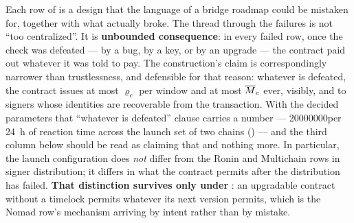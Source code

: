Each row of  is a design that the language of a bridge roadmap could be
mistaken for, together with what actually broke. The thread through the failures is not ``too
centralized''. It is \textbf{unbounded consequence}: in every failed row, once the check was defeated
--- by a bug, by a key, or by an upgrade --- the contract paid out whatever it was told to pay. The
construction's claim is correspondingly narrower than trustlessness, and defensible for that reason:
whatever is defeated, the contract issues at most $\varrho_c$ per window and at most $\overline{M}_{c}$ ever,
visibly, and to signers whose identities are recoverable from the transaction. With the decided
parameters that ``whatever is defeated'' clause carries a number --- \num{20000000}\flux per
\SI{24}{\hour} of reaction time across the launch set of two chains () --- and
the third column below should be read as claiming that and nothing more. In particular, the launch
configuration does \emph{not} differ from the Ronin and Multichain rows in signer distribution; it
differs in what the contract permits after the distribution has failed. \textbf{That distinction
survives only under }: an upgradable contract without a timelock permits
whatever its next version permits, which is the Nomad row's mechanism arriving by intent rather than
by mistake.

